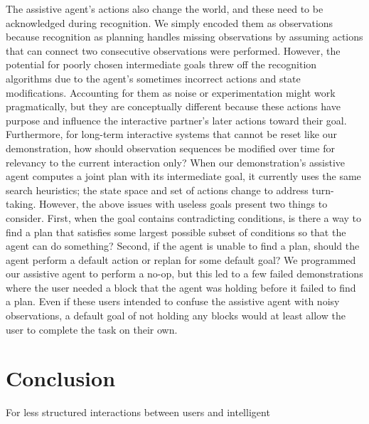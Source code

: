 \documentclass[letterpaper]{article} %
\begin{document}
The assistive agent's actions also change the world, and these need to be acknowledged during recognition.  We simply encoded them as observations because recognition as planning handles missing observations by assuming actions %
that can connect two consecutive observations %
were performed.  However, the potential for poorly chosen intermediate goals %
threw off the recognition algorithms due to the agent's sometimes incorrect actions and state modifications.  Accounting for them as noise or experimentation might work pragmatically, but they are conceptually different because these actions have purpose and influence the interactive partner's later actions toward their goal.  Furthermore, for long-term interactive systems that cannot be reset like our demonstration, how should observation sequences be modified over time for relevancy to the current interaction only?  When our demonstration's assistive agent computes a joint plan with its intermediate goal, it currently uses the same search heuristics; the state space and set of actions change to address turn-taking.  However, the above issues with useless goals present two things to consider.  First, when the goal contains contradicting conditions, is there a way to find a plan that satisfies some largest possible subset of conditions so that the agent can do something?  Second, if the agent is unable to find a plan, should the agent perform a default action or replan for some default goal?  We programmed our assistive agent to perform a no-op, but this led to a few failed demonstrations where the user needed a block that the agent was holding before it failed to find a plan.  Even if these users intended to confuse the assistive agent with noisy observations, a default goal of %
not holding any blocks would at least allow the user to complete the task on their own. %





\section{Conclusion\label{sec:conclusion}}
For less structured interactions between users and intelligent
\end{document}
